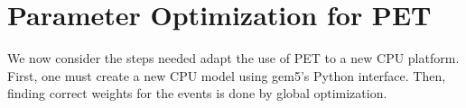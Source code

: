 \chapter{Parameter Optimization for PET}

We now consider the steps needed adapt the use of PET to a new CPU platform.
First, one must create a new CPU model using gem5's Python interface. Then,
finding correct weights for the events is done by global optimization.






